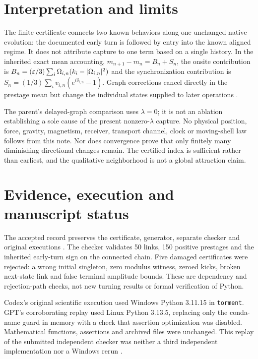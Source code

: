 \documentclass[11pt,a4paper]{article}
\numberwithin{equation}{section}
\theoremstyle{remark}\newtheorem{remark}[theorem]{Remark}
\begin{document}
\section{Interpretation and limits}\label{sec:scope}
The finite certificate connects two known behaviors along one unchanged native evolution: the documented early turn is followed by entry into the known aligned regime. It does not attribute capture to one term based on a single history. In the inherited exact mean accounting, $m_{n+1}-m_n=B_n+S_n$, the onsite contribution is $B_n=(\varepsilon/3)\sum_i\Omega_{i,n}(k_i-|\Omega_{i,n}|^2)$ and the synchronization contribution is $S_n=(1/3)\sum_i v_{i,n}(e^{i\delta_{i,n}}-1)$. Graph corrections cancel directly in the prestage mean but change the individual states supplied to later operations \cite[\texttt{eq:budget}]{parent}.

The parent's delayed-graph comparison uses $\lambda=0$; it is not an ablation establishing a sole cause of the present nonzero-$\lambda$ capture. No physical position, force, gravity, magnetism, receiver, transport channel, clock or moving-shell law follows from this note. Nor does convergence prove that only finitely many diminishing directional changes remain. The certified index is sufficient rather than earliest, and the qualitative neighborhood is not a global attraction claim.

\clearpage
\section{Evidence, execution and manuscript status}\label{sec:evidence}
The accepted record preserves the certificate, generator, separate checker and original executions \cite{capture}. The checker validates 50 links, 150 positive prestages and the inherited early-turn sign on the connected chain. Five damaged certificates were rejected: a wrong initial singleton, zero modulus witness, zeroed kicks, broken next-state link and false terminal amplitude bounds. These are dependency and rejection-path checks, not new turning results or formal verification of Python.

Codex's original scientific execution used Windows Python 3.11.15 in \texttt{torment}. GPT's corroborating replay used Linux Python 3.13.5, replacing only the conda-name guard in memory with a check that assertion optimization was disabled. Mathematical functions, assertions and archived files were unchanged. This replay of the submitted independent checker was neither a third independent implementation nor a Windows rerun \cite[Section 5]{acceptance}.
\end{document}
